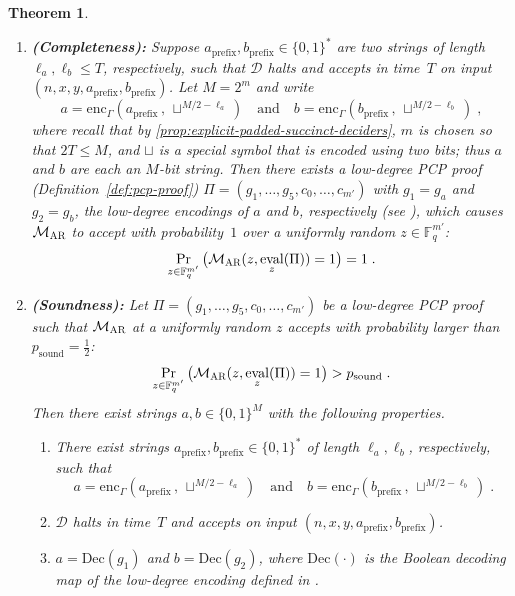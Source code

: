\documentclass[11pt]{article}
\newtheorem{theorem}{Theorem}[section]
\theoremstyle{definition}
\newcommand{\F}{\ensuremath{\mathbb{F}}}
\newcommand{\decider}{\mathcal{D}}
\newcommand{\gamestyle}[1]{\ensuremath{\textsc{#1}}\xspace}
\newcommand{\ar}{\gamestyle{AR}}
\newcommand{\pcpverifier}{\mathcal{M}_\ar}
\DeclareMathOperator{\ev}{eval}
\newcommand{\coded}{\mathrm{Dec}}
\newcommand{\soundness}{\mathrm{sound}}
\begin{document}
\begin{theorem}
  \begin{enumerate}
  \item[3.]
    \textbf{(Completeness):} Suppose $a_{\mathrm{prefix}}, b_{\mathrm{prefix}}
    \in \{0, 1\}^*$ are two strings of length $\ell_a, \ell_b \leq T$,
    respectively, such that $\decider$ halts and accepts in time~$T$ on input $(n, x, y,
    a_{\mathrm{prefix}}, b_{\mathrm{prefix}})$.
    Let $M = 2^m$ and write
    \begin{equation*}
      a = \mathrm{enc}_\Gamma(a_{\mathrm{prefix}}\,,\, \sqcup^{M/2 - \ell_a})
      \quad
      \text{and}
      \quad
      b = \mathrm{enc}_\Gamma(b_{\mathrm{prefix}}\,,\, \sqcup^{M/2 - \ell_b})\;,
    \end{equation*}
    where recall that by
    \cref{prop:explicit-padded-succinct-deciders}, $m$ is chosen so that $2T\leq M$, and $\sqcup$ is a special symbol that
    is encoded using two bits; thus $a$ and $b$ are each an $M$-bit string.
    Then there exists a low-degree PCP proof (Definition~\ref{def:pcp-proof})
    $\Pi = (g_1, \ldots, g_5, c_0, \ldots, c_{m'})$ with $g_1 = g_a$ and $g_2 =
    g_b$, the low-degree encodings of $a$ and $b$, respectively (see
    ), which causes $\pcpverifier$ to accept with
    probability~$1$ over a uniformly random $z \in \F_q^{m'}$:
    \[ \Pr_{z \in \F_q^{m'}}\big(\pcpverifier(z, \ev_{z}(\Pi)) = 1\big) = 1\;. \]
  \item[4.]
    \textbf{(Soundness):} Let $\Pi = (g_1, \ldots, g_5, c_0, \ldots, c_{m'})$ be a
    low-degree PCP proof such that $\pcpverifier$ at a uniformly random $z$
    accepts with probability larger than $p_{\soundness} =\frac{1}{2}$:
    \[ \Pr_{z \in \F_q^{m'}}\big( \pcpverifier(z, \ev_{z}(\Pi)) = 1\big) >
      p_{\soundness}\;. \] Then there exist strings $a, b \in \{0, 1\}^{M}$ with the
    following properties.
    \begin{enumerate}
    \item There exist strings $a_{\mathrm{prefix}}, b_{\mathrm{prefix}} \in \{0,
      1\}^*$ of length $\ell_a, \ell_b$, respectively, such that
      \begin{equation*}
        a = \mathrm{enc}_\Gamma(a_{\mathrm{prefix}}\,,\, \sqcup^{M/2 - \ell_a})
        \quad
        \text{and}
        \quad
        b = \mathrm{enc}_\Gamma(b_{\mathrm{prefix}}\,,\, \sqcup^{M/2 - \ell_b})\;.
      \end{equation*}
    \item $\decider$ halts in time~$T$ and accepts on input $(n, x, y, a_{\mathrm{prefix}},
      b_{\mathrm{prefix}})$.
    \item $a = \coded(g_1)$ and $b = \coded(g_2)$, where $\coded(\cdot)$ is the
      Boolean decoding map of the low-degree encoding defined in
      .
\end{enumerate}

  \end{enumerate}
\end{theorem}
\end{document}
